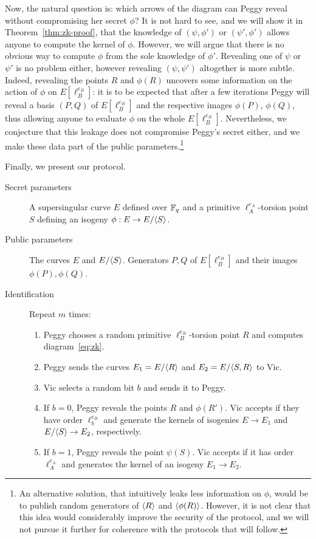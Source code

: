 Now, the natural question is: which arrows of the diagram can Peggy
reveal without compromising her secret $\phi$? It is not hard to see,
and we will show it in Theorem~\ref{thm:zk-proof}, that the knowledge
of $(\psi,\phi')$ or $(\psi',\phi')$ allows anyone to compute the
kernel of $\phi$. However, we will argue that there is no obvious way
to compute $\phi$ from the sole knowledge of $\phi'$. Revealing one of
$\psi$ or $\psi'$ is no problem either, however revealing
$(\psi,\psi')$ altogether is more subtle. Indeed, revealing the points
$R$ and $\phi(R)$ uncovers some information on the action of $\phi$ on
$E[\ell_B^{e_B}]$: it is to be expected that after a few iterations
Peggy will reveal a basis $(P,Q)$ of $E[\ell_B^{e_B}]$ and the
respective images $\phi(P)$, $\phi(Q)$, thus allowing anyone to
evaluate $\phi$ on the whole $E[\ell_B^{e_B}]$. Nevertheless, we
conjecture that this leakage does not compromise Peggy's secret
either, and we make these data part of the public
parameters.\footnote{An alternative solution, that intuitively leaks
  less information on $\phi$, would be to publish random generators of
  ${\langle R \rangle}$ and ${\langle \phi(R) \rangle}$.  However, it is not clear that this
  idea would considerably improve the security of the protocol, and we
  will not pursue it further for coherence with the protocols that
  will follow.}

Finally, we present our protocol.

\begin{description}
\item[Secret parameters] A supersingular curve $E$ defined over
  ${\mathbb{F}}_q$ and a primitive $\ell_A^{e_A}$-torsion point $S$ defining an
  isogeny $\phi:E\to E/{\langle S \rangle}$.
\item[Public parameters] The curves $E$ and $E/{\langle S \rangle}$. Generators
  $P,Q$ of $E[\ell_B^{e_B}]$ and their images $\phi(P),\phi(Q)$.
\item[Identification] Repeat $m$ times:
  \begin{enumerate}
  \item Peggy chooses a random primitive $\ell_B^{e_B}$-torsion point
    $R$ and computes diagram~\eqref{eq:zk}.
  \item Peggy sends the curves $E_1=E/{\langle R \rangle}$ and $E_2=E/{\langle S,R \rangle}$ to Vic.
  \item Vic selects a random bit $b$ and sends it to Peggy.
  \item If $b=0$, Peggy reveals the points $R$ and $\phi(R')$. Vic
    accepts if they have order $\ell_b^{e_B}$ and generate the kernels
    of isogenies $E\to E_1$ and $E/{\langle S \rangle}\to E_2$, respectively.
  \item If $b=1$, Peggy reveals the point $\psi(S)$. Vic accepts if it
    has order $\ell_A^{e_A}$ and generates the kernel of an isogeny
    $E_1\to E_2$.
  \end{enumerate}
\end{description}


